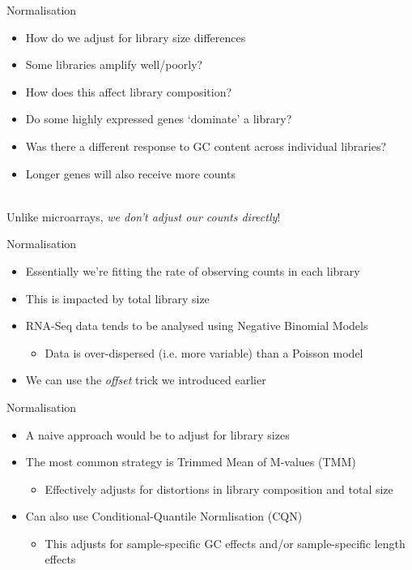 \documentclass[aspectratio=169,11pt]{beamer}
\begin{document}
\begin{frame}{Normalisation}

	\begin{itemize}
		\item How do we adjust for library size differences
		\item Some libraries amplify well/poorly?
		\item How does this affect library composition?
		\item Do some highly expressed genes `dominate' a library?
		\item Was there a different response to GC content across individual libraries?
		\item Longer genes will also receive more counts
	\end{itemize}
	~\\
	Unlike microarrays, \textit{we don't adjust our counts directly}!

\end{frame}

\begin{frame}{Normalisation}

	\begin{itemize}
		\item Essentially we're fitting the rate of observing counts in each library
		\item This is impacted by total library size
		\item RNA-Seq data tends to be analysed using Negative Binomial Models
		\begin{itemize}
			\item Data is over-dispersed (i.e. more variable) than a Poisson model
		\end{itemize}
		\item We can use the \textit{offset} trick we introduced earlier
	\end{itemize}

\end{frame}


\begin{frame}{Normalisation}

	\begin{itemize}
		\item A naive approach would be to adjust for library sizes\\[2mm]
		\item The most common strategy is Trimmed Mean of M-values (TMM)
		\begin{itemize}
			\item Effectively adjusts for distortions in library composition and total size\\[2mm]
		\end{itemize}
		\item Can also use Conditional-Quantile Normlisation (CQN)
		\begin{itemize}
			\item This adjusts for sample-specific GC effects and/or sample-specific length effects
		\end{itemize}
	\end{itemize}

\end{frame}
\end{document}
